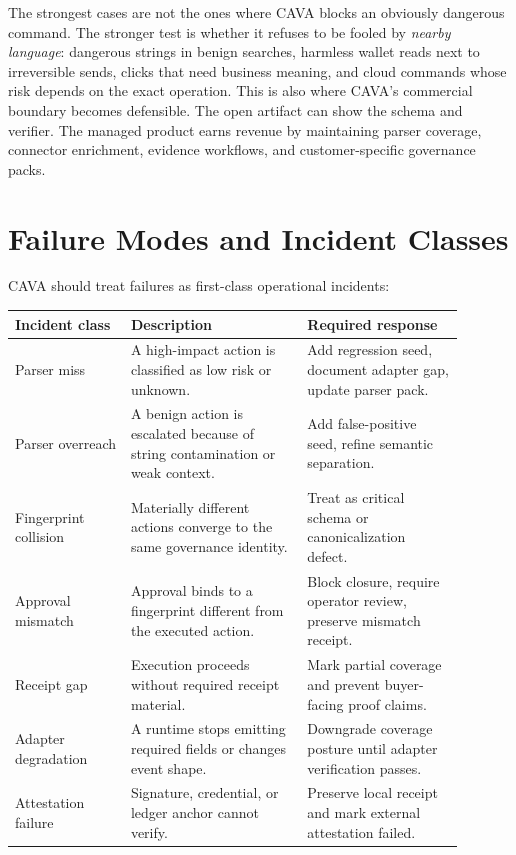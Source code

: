 \documentclass[11pt]{article}
\begin{document}
The strongest cases are not the ones where CAVA blocks an obviously dangerous command. The stronger test is whether it refuses to be fooled by \emph{nearby language}: dangerous strings in benign searches, harmless wallet reads next to irreversible sends, clicks that need business meaning, and cloud commands whose risk depends on the exact operation. This is also where CAVA's commercial boundary becomes defensible. The open artifact can show the schema and verifier. The managed product earns revenue by maintaining parser coverage, connector enrichment, evidence workflows, and customer-specific governance packs.

\section{Failure Modes and Incident Classes}

CAVA should treat failures as first-class operational incidents:

\begin{longtable}{@{}L{0.23\linewidth}L{0.35\linewidth}L{0.31\linewidth}@{}}
\toprule
Incident class & Description & Required response \\
\midrule
Parser miss & A high-impact action is classified as low risk or unknown. & Add regression seed, document adapter gap, update parser pack. \\
Parser overreach & A benign action is escalated because of string contamination or weak context. & Add false-positive seed, refine semantic separation. \\
Fingerprint collision & Materially different actions converge to the same governance identity. & Treat as critical schema or canonicalization defect. \\
Approval mismatch & Approval binds to a fingerprint different from the executed action. & Block closure, require operator review, preserve mismatch receipt. \\
Receipt gap & Execution proceeds without required receipt material. & Mark partial coverage and prevent buyer-facing proof claims. \\
Adapter degradation & A runtime stops emitting required fields or changes event shape. & Downgrade coverage posture until adapter verification passes. \\
Attestation failure & Signature, credential, or ledger anchor cannot verify. & Preserve local receipt and mark external attestation failed. \\
\bottomrule
\end{longtable}
\end{document}
